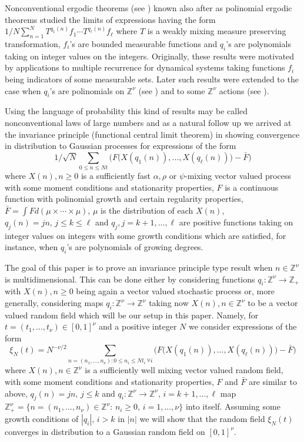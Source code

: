 Nonconventional ergodic theorems (see \cite{Fu}) known also after \cite{Be}
as polinomial ergodic theorems studied the limits
 of expressions having the 
form $1/N\sum_{n=1}^NT^{q_1(n)}f_1\cdots T^{q_\ell (n)}f_\ell$ where $T$ is a
weakly mixing measure preserving transformation, $f_i$'s are bounded measurable
functions and $q_i$'s are polynomials taking on integer values on the integers.
Originally, these results were motivated by applications to multiple recurrence
for dynamical systems taking functions $f_i$ being indicators of some measurable
sets. Later such results were extended to the case when $q_i$'s are
polinomials on ${{\mathbb Z}}^\nu$ (see \cite{Le}) and to some ${{\mathbb Z}}^\nu$ actions
(see \cite{Au}).

Using the language of probability this kind of results may be called 
nonconventional laws of large numbers and as a natural follow up we arrived at
the invariance principle (functional central limit theorem) in \cite{KV} 
showing convergence in distribution to Gaussian processes for expressions
 of the form
\begin{equation}\label{1.1}
1/\sqrt{N}\sum_{0\leq n\leq Nt}\big(F\big(X(q_1(n)),..., X(q_\ell(n))\big)
-\bar F\big)
\end{equation}
where $X(n),n\geq 0$ is a sufficiently fast ${{\alpha}},\rho$ or $\psi$-mixing 
vector valued process with some moment conditions and stationarity properties,
$F$ is a continuous function with polinomial growth and certain regularity
properties, $\bar F=\int Fd(\mu\times\cdots\times\mu)$, $\mu$ is the 
distribution of each $X(n)$, $q_j(n)=jn,\, j\leq k\leq\ell$ and $q_j,j=k+1,
...,\ell$ are positive
functions taking on integer values on integers with some growth conditions 
which are satisfied, for instance, when $q_i$'s are polynomials of growing 
degrees. 

The goal of this paper is to prove an invariance principle type result when
$n\in{{\mathbb Z}}^\nu$ is multidimensional. This can be done either by considering
functions $q_i:{{\mathbb Z}}^\nu\to{{\mathbb Z}}_+$ with $X(n),n\geq 0$ being again a vector
valued stochastic process or, more generally, considering maps
$q_i:{{\mathbb Z}}^\nu\to{{\mathbb Z}}^\nu$ taking now $X(n),n\in{{\mathbb Z}}^\nu$ to be a vector 
valued random field which will be our setup in this paper. Namely, for
$t=(t_1,...,t_\nu)\in [0,1]^\nu$ and a positive integer $N$ we  consider 
expressions of the form
\begin{equation}\label{1.2}
\xi_N(t)=N^{-\nu/2}\sum_{n=(n_1,...,n_\nu):0\leq n_i\leq Nt_i\,\forall i}\big(
F\big(X(q_1(n)),..., X(q_\ell(n))\big)-\bar F\big)
\end{equation}
where $X(n),n\in{{\mathbb Z}}^\nu$ is
a sufficiently well mixing vector valued random field, with some moment 
conditions and stationarity properties, $F$ and $\bar F$ are similar to above,
$q_j(n)=jn,\, j\leq k$ and $q_i:{{\mathbb Z}}^\nu\to{{\mathbb Z}}^\nu,\, i=k+1,...,\ell$ map
${{\mathbb Z}}_+^\nu=\{ n=(n_1,...,n_\nu)\in{{\mathbb Z}}^\nu:\, n_i\geq 0,\, i=1,...,\nu\}$
into itself. Assuming some growth conditions of $|q_i|,\, i>k$ in $|n|$ we 
will show that the random field $\xi_N(t)$ converges in distribution to a
Gaussian random field on $[0,1]^\nu$.

